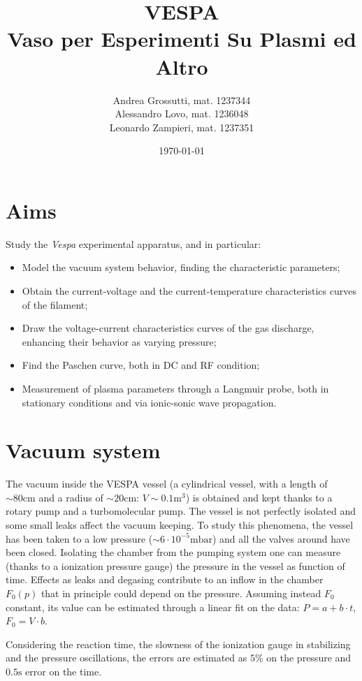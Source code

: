 \documentclass[11pt,a4 paper]{article}
\title{VESPA\\Vaso per Esperimenti Su Plasmi ed Altro}
\author{Andrea Grossutti, mat. 1237344\\Alessandro Lovo, mat. 1236048\\Leonardo Zampieri, mat. 1237351}
\date{\today}
\begin{document}
\maketitle

\section{Aims}
Study the \emph{Vespa} experimental apparatus, and in particular:
\begin{itemize}[noitemsep]
    \item Model the vacuum system behavior, finding the characteristic parameters;
    \item Obtain the current-voltage and the current-temperature characteristics curves of the filament;
    \item Draw the voltage-current characteristics curves of the gas discharge, enhancing their behavior as varying pressure;
    \item Find the Paschen curve, both in DC and RF condition;
    \item Measurement of plasma parameters through a Langmuir probe, both in stationary conditions and via ionic-sonic wave propagation.
\end{itemize}


\section{Vacuum system}
The vacuum inside the VESPA vessel (a cylindrical  vessel, with a length of $\sim80\si{\centi\metre}$ and a radius of $\sim20\si{\centi\metre}$: $V\sim0.1\si{\metre^3}$) is obtained and kept thanks to a rotary pump and a turbomolecular pump. The vessel is not perfectly isolated and some small leaks affect the vacuum keeping. To study this phenomena, the vessel has been taken to a low pressure ($\sim 6 \cdot 10^{-5} \si{\milli\bar}$) and all the valves around have been closed. Isolating the chamber from the pumping system one can measure (thanks to a ionization pressure gauge) the pressure in the vessel as function of time. Effects as leaks and degasing contribute to an inflow in the chamber $F_0(p)$ that in principle could depend on the pressure. Assuming instead $F_0$ constant, its value can be estimated through a linear fit on the data: $P = a + b \cdot t$, $F_0 = V \cdot b$.

Considering the reaction time, the slowness of the ionization gauge in stabilizing and the pressure oscillations, the errors are estimated as $5\%$ on the pressure and $0.5\si{\second}$ error on the time.
\end{document}
